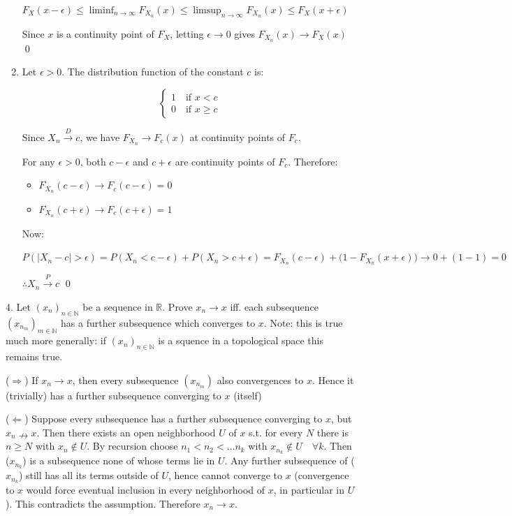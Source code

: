 \documentclass[10pt]{article}
\begin{document}
\begin{enumerate}[label=\textit{(\roman*)}]
    $F_X(x - \epsilon) \leq \liminf_{n\to\infty}F_{X_n}(x) \leq \limsup_{n\to\infty}F_{X_n}(x) \leq F_X(x + \epsilon)$

    Since $x$ is a continuity point of $F_X$, letting $\epsilon\to 0$ gives $F_{X_n}(x) \to F_X(x)$ \qed
    \item Let $\epsilon > 0$. The distribution function of the constant $c$ is:
    
    \[
    \begin{cases}
        1 \quad\text{if } x < c \\
        0 \quad\text{if } x \geq c
    \end{cases}
    \]

    Since $X_n \xrightarrow{D} c$, we have $F_{X_n} \to F_c(x)$ at continuity points of $F_c$.

    For any $\epsilon > 0$, both $c - \epsilon$ and $c + \epsilon$ are continuity points of $F_c$. Therefore:

    \begin{itemize}
        \item $F_{X_n}(c - \epsilon)\to F_c (c-\epsilon) = 0$
        \item $F_{X_n}(c + \epsilon)\to F_c (c+\epsilon) = 1$
    \end{itemize}

    Now:

    $P(|X_n - c| > \epsilon) = P(X_n < c - \epsilon) + P(X_n > c + \epsilon) = F_{X_n}(c - \epsilon) + \big(1 -F_{X_n}(x + \epsilon)\big) \to 0 + (1-1) = 0$

    $\therefore X_n \xrightarrow{P} c$ \qed
\end{enumerate}

\newpage

4. Let $(x_n)_{n \in \mathbb{N}}$ be a sequence in $\mathbb{R}$. Prove $x_n \to x$ iff. each subsequence $(x_{n_m})_{m\in \mathbb{N}}$ has a further subsequence which converges to $x$. Note: this is true much more generally: if $(x_n)_{n \in \mathbb{N}}$ is a squence in a topological space this remains true.

($\Rightarrow$) If $x_n \to x$, then every subsequence $(x_{n_m})$ also convergences to $x$. Hence it (trivially) has a further subsequence converging to $x$ (itself)

($\Leftarrow$) Suppose every subsequence has a further subsequence converging to $x$, but $x_n \nrightarrow x$. Then there exists an open neighborhood $U$ of $x$ s.t. for every $N$ there is $n \geq N$ with $x_n \notin U$. By recursion choose $n_1 < n_2 < … n_k$ with $x_{n_k} \notin U \quad\forall k$. Then ($x_{n_k}$) is a subsequence none of whose terms lie in $U$. Any further subsequence of ($x_{n_k}$) still has all its terms outside of $U$, hence cannot converge to $x$ (convergence to $x$ would force eventual inclusion in every neighborhood of $x$, in particular in $U$). This contradicts the assumption. Therefore $x_n \to x$.
\end{document}

